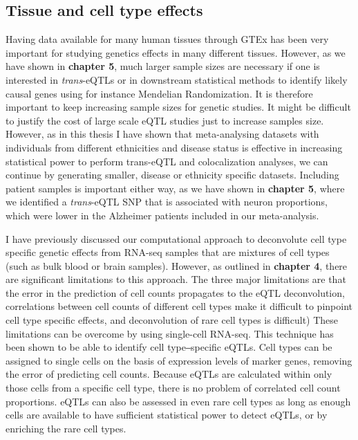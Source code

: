 \subsection{Tissue and cell type effects}
Having data available for many human tissues through GTEx\cite{thegtexconsortiumGTExConsortiumAtlas2020} has been very important for studying genetics effects in many different tissues. However, as we have shown in \textbf{chapter 5}, much larger sample sizes are necessary if one is interested in \textit{trans}-eQTLs or in downstream statistical methods to identify likely causal genes using for instance Mendelian Randomization. It is therefore important to keep increasing sample sizes for genetic studies. It might be difficult to justify the cost of large scale eQTL studies just to increase samples size. However, as in this thesis I have shown that meta-analysing datasets with individuals from different ethnicities and disease status is effective in increasing statistical power to perform trans-eQTL and colocalization analyses, we can continue by generating smaller, disease or ethnicity specific datasets. Including patient samples is important either way, as we have shown in \textbf{chapter 5}, where we identified a \textit{trans}-eQTL SNP that is associated with neuron proportions, which were lower in the Alzheimer patients included in our meta-analysis. 

I have previously discussed our computational approach to deconvolute cell type specific genetic effects from RNA-seq samples that are mixtures of cell types (such as bulk blood or brain samples). However, as outlined in \textbf{chapter 4}, there are significant limitations to this approach. The three major limitations are that the error in the prediction of cell counts propagates to the eQTL deconvolution, correlations between cell counts of different cell types make it difficult to pinpoint cell type specific effects, and deconvolution of rare cell types is difficult) These limitations can be overcome by using single-cell RNA-seq\cite{tangMRNASeqWholetranscriptomeAnalysis2009}. This technique has been shown to be able to identify cell type‒specific eQTLs\cite{wijstSinglecellRNASequencing2018}. Cell types can be assigned to single cells on the basis of expression levels of marker genes, removing the error of predicting cell counts. Because eQTLs are calculated within only those cells from a specific cell type, there is no problem of correlated cell count proportions. eQTLs can also be assessed in even rare cell types as long as enough cells are available to have sufficient statistical power to detect eQTLs, or by enriching the rare cell types.


